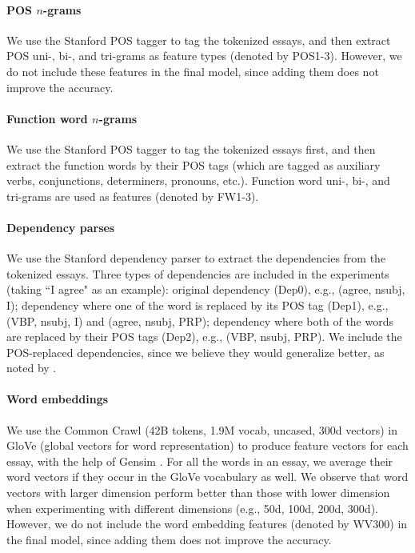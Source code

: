 \documentclass[11pt,letterpaper]{article}
\begin{document}
\paragraph{POS $n$-grams}
We use the Stanford POS tagger \cite{tagging} to tag the tokenized essays, and then extract POS uni-, bi-, and tri-grams as feature types (denoted by POS1-3). However, we do not include these features in the final model, since adding them does not improve the accuracy.

\paragraph{Function word $n$-grams}
We use the Stanford POS tagger to tag the tokenized essays first, and then extract the function words by their POS tags (which are tagged as auxiliary verbs, conjunctions, determiners, pronouns, etc.). Function word uni-, bi-, and tri-grams are used as features (denoted by FW1-3).

\paragraph{Dependency parses}
We use the Stanford dependency parser \cite{parsing} to extract the dependencies from the tokenized essays. Three types of dependencies are included in the experiments (taking ``I agree" as an example): original dependency (Dep0), e.g., (agree, nsubj, I); dependency where one of the word is replaced by its POS tag (Dep1), e.g., (VBP, nsubj, I) and (agree, nsubj, PRP); dependency where both of the words are replaced by their POS tags (Dep2), e.g., (VBP, nsubj, PRP). We include the POS-replaced dependencies, since we believe they would generalize better, as noted by \citet{malmasi:2017:nlisg}.

\paragraph{Word embeddings}
We use the Common Crawl (42B tokens, 1.9M vocab, uncased, 300d vectors) in GloVe (global vectors for word representation) \cite{glove} to produce feature vectors for each essay, with the help of Gensim \cite{gensim}. For all the words in an essay, we average their word vectors if they occur in the GloVe vocabulary as well. We observe that word vectors with larger dimension perform better than those with lower dimension when experimenting with different dimensions (e.g., 50d, 100d, 200d, 300d). However, we do not include the word embedding features (denoted by WV300) in the final model, since adding them does not improve the accuracy.
\end{document}
